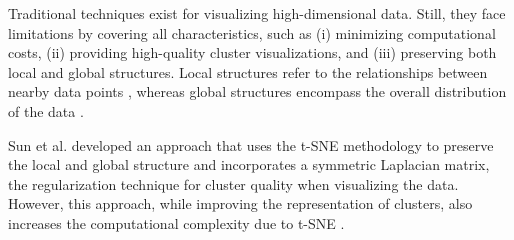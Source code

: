 \begin{table}[!htbp]
 \caption{A comparative analysis of Proposed Model and Existing Techniques}
    \centering
    \label{rqofpm}
\end{table}

Traditional techniques \cite{tsne} \cite{umap_reference} \cite{sun2023laplacian} exist for visualizing high-dimensional data. Still, they face limitations by covering all characteristics, such as (i) minimizing computational costs, (ii) providing high-quality cluster visualizations, and (iii) preserving both local and global structures. Local structures refer to the relationships between nearby data points \cite{tsne}, whereas global structures encompass the overall distribution of the data \cite{umap_reference} \cite{tenenbaum2000global}.   

Sun et al. \cite{sun2023laplacian} developed an approach that uses the t-SNE \cite{tsne} methodology to preserve the local and global structure and incorporates a symmetric Laplacian matrix, the regularization technique for cluster quality when visualizing the data. However, this approach, while improving the representation of clusters, also increases the computational complexity due to t-SNE \cite{tsne}.


